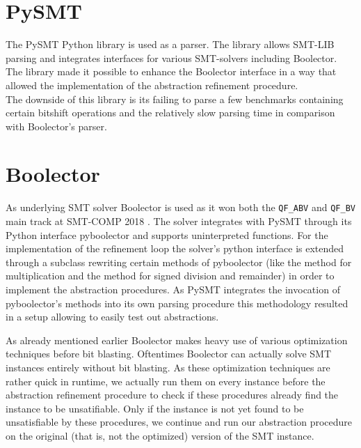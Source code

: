 \section{PySMT}
\label{sec:implementation:pysmt}
The PySMT Python library \cite{pysmt2015} is used as a parser. The library allows
SMT-LIB parsing and integrates interfaces for various SMT-solvers including Boolector.
The library made it possible to enhance the Boolector interface in a way that allowed the implementation
of the abstraction refinement procedure.\\
The downside of this library is its failing to parse a few benchmarks containing certain bitshift operations
and the relatively slow parsing time in comparison with Boolector's parser\footnotemark.

\section{Boolector}
\label{sec:implementation:boolector}
As underlying SMT solver Boolector \cite{Brummayer-Biere2009_Chapter_BoolectorAnEfficientSMTSolverF} is used
as it won both the \texttt{QF\_ABV} and \texttt{QF\_BV} main track at SMT-COMP 2018 \cite{SMTCOMP18}.
The solver integrates with PySMT through its Python interface pyboolector and supports uninterpreted functions.
For the implementation of the refinement loop the solver's python interface is extended through a subclass rewriting certain methods of pyboolector
(like the method for multiplication and the method for signed division and remainder) in order to implement the abstraction procedures.
As PySMT integrates the invocation of pyboolector's methods into its own parsing procedure this methodology resulted in a setup allowing to
easily test out abstractions.
\par
As already mentioned earlier Boolector makes heavy use of various optimization techniques before bit blasting.
Oftentimes Boolector can actually solve SMT instances entirely without bit blasting.
As these optimization techniques are rather quick in runtime, we actually run them on every instance before the abstraction refinement procedure to check if these
procedures already find the instance to be unsatifiable.
Only if the instance is not yet found to be unsatisfiable by these procedures, we continue and run our abstraction procedure on the original (that is, not the optimized) version of the SMT instance.


